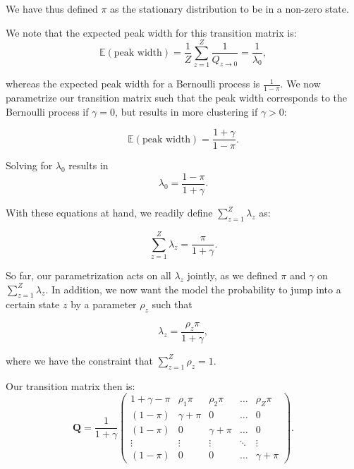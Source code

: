 \documentclass[a4paper,11pt]{article}
\def\Q{\boldsymbol{Q}}
\def\E{\mathbb{E}}
\begin{document}
We have thus defined $\pi$ as the stationary distribution to be in a non-zero state.

We note that the expected peak width for this transition matrix is:
\begin{equation*}
 \E(\mbox{peak width}) = \frac{1}{Z} \sum_{z=1}^Z \frac{1}{Q_{z \to 0}} = \frac{1}{\lambda_0},
\end{equation*}

whereas the expected peak width for a Bernoulli process is $\frac{1}{1-\pi}$. We now parametrize our transition matrix such that the peak width corresponds to the Bernoulli process if $\gamma = 0$, but results in more clustering if $\gamma > 0$:

\begin{equation*}
 \E(\mbox{peak width}) = \frac{1 + \gamma}{1 - \pi}.
\end{equation*}

Solving for $\lambda_0$ results in
\begin{equation*}
 \lambda_0 = \frac{1 - \pi}{1 + \gamma}.
\end{equation*}

With these equations at hand, we readily define $\sum_{z=1}^Z \lambda_z$ as:

\begin{equation*}
 \sum_{z=1}^Z \lambda_z = \frac{\pi}{1 + \gamma}.
\end{equation*}

So far, our parametrization acts on all $\lambda_z$ jointly, as we defined $\pi$ and $\gamma$ on $\sum_{z=1}^Z \lambda_z$. In addition, we now want the model the probability to jump into a certain state $z$ by a parameter $\rho_z$ such that

\begin{equation*}
 \lambda_z = \frac{\rho_z \pi}{1 + \gamma},
\end{equation*}

where we have the constraint that $\sum_{z=1}^Z \rho_z = 1$.

Our transition matrix then is:
\begin{equation*}
 \Q =  \frac{1}{1 + \gamma} \begin{pmatrix}
  1 + \gamma - \pi & \rho_1 \pi & \rho_2 \pi & \ldots & \rho_Z \pi \\
  (1-\pi) & \gamma + \pi & 0 & \ldots & 0 \\
    (1-\pi) & 0 & \gamma + \pi & \ldots & 0 \\
  \vdots & \vdots & \vdots & \ddots & \vdots \\
  (1-\pi) & 0 & 0 & \ldots & \gamma + \pi
\end{pmatrix}.
\end{equation*}
\end{document}
